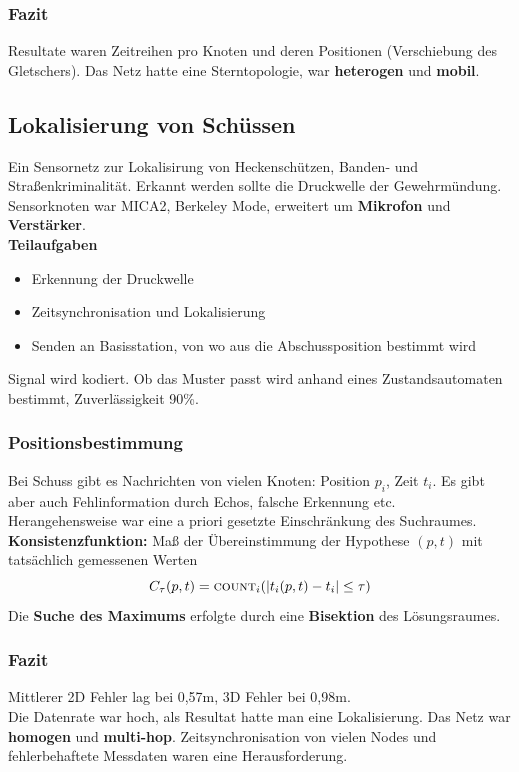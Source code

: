 \documentclass[a4paper]{article}
\begin{document}
\subsubsection{Fazit}
Resultate waren Zeitreihen pro Knoten und deren Positionen (Verschiebung des Gletschers). Das Netz hatte eine Sterntopologie, war \textbf{heterogen} und \textbf{mobil}.

\subsection{Lokalisierung von Schüssen}
Ein Sensornetz zur Lokalisirung von Heckenschützen, Banden- und Straßenkriminalität. Erkannt werden sollte die Druckwelle der Gewehrmündung.\\
Sensorknoten war MICA2, Berkeley Mode, erweitert um \textbf{Mikrofon }und \textbf{Verstärker}.\\

\textbf{Teilaufgaben}
\begin{itemize}
	\item Erkennung der Druckwelle
	\item Zeitsynchronisation und Lokalisierung
	\item Senden an Basisstation, von wo aus die Abschussposition bestimmt wird
\end{itemize}
Signal wird kodiert. Ob das Muster passt wird anhand eines Zustandsautomaten bestimmt, Zuverlässigkeit 90\%.
\subsubsection{Positionsbestimmung}
Bei Schuss gibt es Nachrichten von vielen Knoten: Position $p_i$, Zeit $t_i$. Es gibt aber auch Fehlinformation durch Echos, falsche Erkennung etc. \\
Herangehensweise war eine a priori gesetzte Einschränkung des Suchraumes.\\
\textbf{Konsistenzfunktion:} Maß der Übereinstimmung der Hypothese $(p,t)$ mit tatsächlich gemessenen Werten
$$C_\tau (p,t) = \textsc{count}_i(|t_i(p,t)-t_i|\leq \tau)$$
Die \textbf{Suche des Maximums} erfolgte durch eine \textbf{Bisektion} des Lösungsraumes.
\subsubsection{Fazit}
Mittlerer 2D Fehler lag bei 0,57m, 3D Fehler bei 0,98m.\\
Die Datenrate war hoch, als Resultat hatte man eine Lokalisierung. Das Netz war \textbf{homogen} und \textbf{multi-hop}. Zeitsynchronisation von vielen Nodes und fehlerbehaftete Messdaten waren eine Herausforderung.
\end{document}
